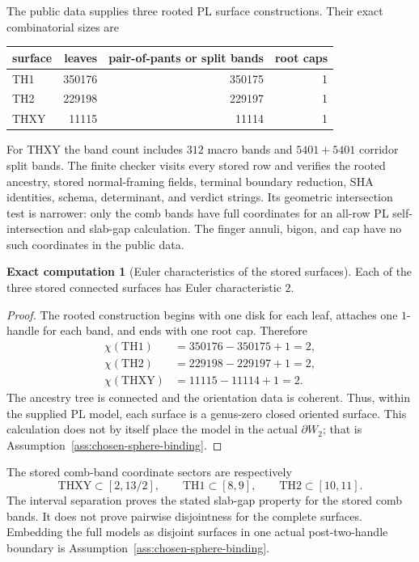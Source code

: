 \documentclass[10pt,reqno]{amsart}
\theoremstyle{definition}
\newtheorem{computation}[theorem]{Exact computation}
\theoremstyle{remark}
\begin{document}
The public data supplies three rooted PL surface constructions.  Their exact
combinatorial sizes are
\begin{center}
\begin{tabular}{@{}lrrr@{}}
\toprule
surface & leaves & pair-of-pants or split bands & root caps\\
\midrule
TH1 & 350176 & 350175 & 1\\
TH2 & 229198 & 229197 & 1\\
THXY & 11115 & 11114 & 1\\
\bottomrule
\end{tabular}
\end{center}
For THXY the band count includes $312$ macro bands and $5401+5401$ corridor
split bands.  The finite checker visits every stored row and verifies the
rooted ancestry, stored normal-framing fields, terminal boundary reduction,
SHA identities, schema, determinant, and verdict strings.  Its geometric
intersection test is narrower: only the comb bands have full coordinates for
an all-row PL self-intersection and slab-gap calculation.  The finger annuli,
bigon, and cap have no such coordinates in the public data.

\begin{computation}[Euler characteristics of the stored surfaces]\label{comp:sphere-euler}
Each of the three stored connected surfaces has Euler characteristic $2$.
\end{computation}

\begin{proof}
The rooted construction begins with one disk for each leaf, attaches one
$1$-handle for each band, and ends with one root cap.  Therefore
\begin{align}
\chi(\mathrm{TH1})&=350176-350175+1=2,\label{eq:chi-th1}\\
\chi(\mathrm{TH2})&=229198-229197+1=2,\label{eq:chi-th2}\\
\chi(\mathrm{THXY})&=11115-11114+1=2.\label{eq:chi-thxy}
\end{align}
The ancestry tree is connected and the orientation data is coherent.  Thus,
within the supplied PL model, each surface is a genus-zero closed oriented
surface.  This calculation does not by itself place the model in the actual
$\partial W_2$; that is Assumption~\ref{ass:chosen-sphere-binding}.
\end{proof}

The stored comb-band coordinate sectors are respectively
\begin{equation}\label{eq:sphere-sectors}
\mathrm{THXY}\subset[2,13/2],\qquad
\mathrm{TH1}\subset[8,9],\qquad
\mathrm{TH2}\subset[10,11].
\end{equation}
The interval separation proves the stated slab-gap property for the stored
comb bands.  It does not prove pairwise disjointness for the complete surfaces.
Embedding the full models as disjoint surfaces in one actual post-two-handle
boundary is Assumption~\ref{ass:chosen-sphere-binding}.
\end{document}
